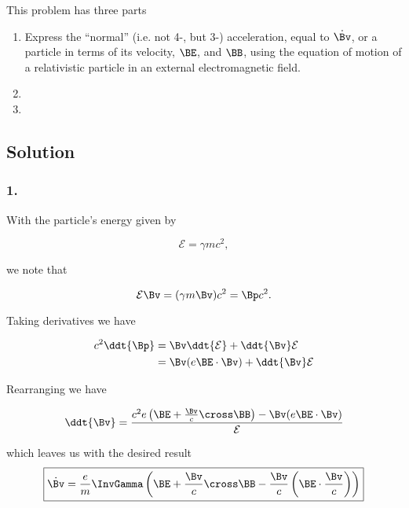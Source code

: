 This problem has three parts
\begin{enumerate}
\item Express the ``normal'' (i.e. not 4-, but 3-) acceleration, equal to $\dot{\Bv}$, or a particle in terms of its velocity, $\BE$, and $\BB$, using the equation of motion of a relativistic particle in an external electromagnetic field.
\item
\item
\end{enumerate}
\subsection{Solution}
\subsubsection{1.}

With the particle's energy given by

\begin{equation}\label{eqn:relElectroDynProblemSet2:n}
\mathcal{E} = \gamma m c^2,
\end{equation}

we note that

\begin{equation}\label{eqn:relElectroDynProblemSet2:n}
\mathcal{E}\Bv = (\gamma m \Bv) c^2 = \Bp c^2.
\end{equation}

Taking derivatives we have

\begin{align*}
c^2 \ddt{\Bp} 
&= \Bv \ddt{\mathcal{E}} + \ddt{\Bv} \mathcal{E} \\
&= \Bv (e \BE \cdot \Bv) + \ddt{\Bv} \mathcal{E} \\
\end{align*}

Rearranging we have

\begin{equation}\label{eqn:relElectroDynProblemSet2:n}
\ddt{\Bv}
=
\frac{c^2 e \left( \BE + \frac{\Bv}{c} \cross \BB \right) - \Bv (e \BE \cdot \Bv) }{ \mathcal{E} } 
\end{equation}

which leaves us with the desired result
\begin{equation}\label{eqn:relElectroDynProblemSet2:n}
\boxed{
\dot{\Bv} =
\frac{e}{m} \InvGamma \left( \BE + \frac{\Bv}{c} \cross \BB - \frac{\Bv}{c} \left(\BE \cdot \frac{\Bv}{c} \right) \right)
}
\end{equation}

